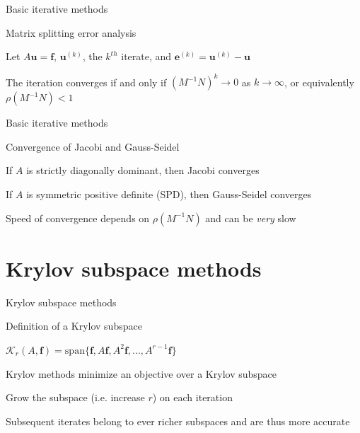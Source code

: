 \documentclass[18pt,xcolor=table]{beamer}
\begin{document}
\begin{frame}{Basic iterative methods}
\begin{block}{Matrix splitting error analysis}
\bit
\item Let $A\mathbf{u} = \mathbf{f}$, $\mathbf{u}^{(k)}$, the $k^{th}$ iterate, and $\mathbf{e}^{(k)} = \mathbf{u}^{(k)} - \mathbf{u}$
\eit
{}
\bit
\item The iteration converges if and only if $(M^{-1}N)^k \rightarrow 0$ as $k\rightarrow \infty$, or equivalently $\rho (M^{-1}N) < 1$
\eit
\end{block}
\end{frame}

\begin{frame}{Basic iterative methods}
\begin{block}{Convergence of Jacobi and Gauss-Seidel}
\bit
\item If $A$ is strictly diagonally dominant, then Jacobi converges
\item If $A$ is symmetric positive definite (SPD), then Gauss-Seidel converges
\item Speed of convergence depends on $\rho (M^{-1}N)$ and can be \emph{very} slow
\eit
\end{block}
\end{frame}



\section{Krylov subspace methods}

\begin{frame}{Krylov subspace methods}
\begin{block}{Definition of a Krylov subspace}
\bit
\item $\mathcal{K}_r(A,\mathbf{f}) = \text{span}\{\mathbf{f},A\mathbf{f},A^2\mathbf{f},...,A^{r-1}\mathbf{f}\}$
\item Krylov methods minimize an objective over a Krylov subspace
\item Grow the subspace (i.e. increase $r$) on each iteration
\item Subsequent iterates belong to ever richer subspaces and are thus more accurate
\eit
\end{block}
\end{frame}
\end{document}
